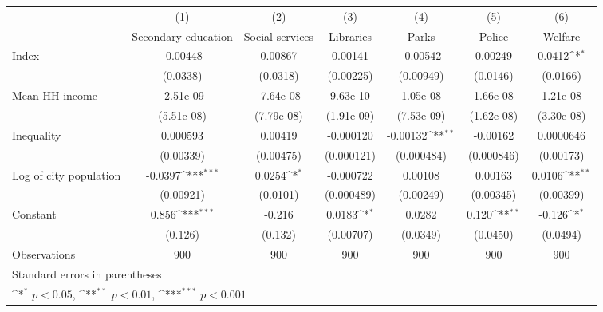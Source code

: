 {
\def\sym#1{\ifmmode^{#1}\else\(^{#1}\)\fi}
\begin{tabular}{l*{6}{c}}
\hline\hline
                    &\multicolumn{1}{c}{(1)}&\multicolumn{1}{c}{(2)}&\multicolumn{1}{c}{(3)}&\multicolumn{1}{c}{(4)}&\multicolumn{1}{c}{(5)}&\multicolumn{1}{c}{(6)}\\
                    &\multicolumn{1}{c}{Secondary education}&\multicolumn{1}{c}{Social services}&\multicolumn{1}{c}{Libraries}&\multicolumn{1}{c}{Parks}&\multicolumn{1}{c}{Police}&\multicolumn{1}{c}{Welfare}\\
\hline
Index               &    -0.00448         &     0.00867         &     0.00141         &    -0.00542         &     0.00249         &      0.0412\sym{*}  \\
                    &    (0.0338)         &    (0.0318)         &   (0.00225)         &   (0.00949)         &    (0.0146)         &    (0.0166)         \\
[1em]
Mean HH income      &   -2.51e-09         &   -7.64e-08         &    9.63e-10         &    1.05e-08         &    1.66e-08         &    1.21e-08         \\
                    &  (5.51e-08)         &  (7.79e-08)         &  (1.91e-09)         &  (7.53e-09)         &  (1.62e-08)         &  (3.30e-08)         \\
[1em]
Inequality          &    0.000593         &     0.00419         &   -0.000120         &    -0.00132\sym{**} &    -0.00162         &   0.0000646         \\
                    &   (0.00339)         &   (0.00475)         &  (0.000121)         &  (0.000484)         &  (0.000846)         &   (0.00173)         \\
[1em]
Log of city population&     -0.0397\sym{***}&      0.0254\sym{*}  &   -0.000722         &     0.00108         &     0.00163         &      0.0106\sym{**} \\
                    &   (0.00921)         &    (0.0101)         &  (0.000489)         &   (0.00249)         &   (0.00345)         &   (0.00399)         \\
[1em]
Constant            &       0.856\sym{***}&      -0.216         &      0.0183\sym{*}  &      0.0282         &       0.120\sym{**} &      -0.126\sym{*}  \\
                    &     (0.126)         &     (0.132)         &   (0.00707)         &    (0.0349)         &    (0.0450)         &    (0.0494)         \\
\hline
Observations        &         900         &         900         &         900         &         900         &         900         &         900         \\
\hline\hline
\multicolumn{7}{l}{\footnotesize Standard errors in parentheses}\\
\multicolumn{7}{l}{\footnotesize \sym{*} \(p<0.05\), \sym{**} \(p<0.01\), \sym{***} \(p<0.001\)}\\
\end{tabular}
}